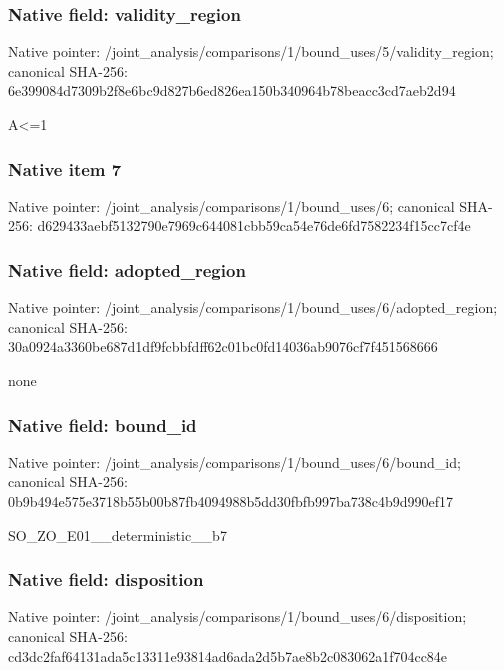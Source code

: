 \documentclass[10pt,a4paper]{article}
\begin{document}
\subsubsection{Native field: validity\_\allowbreak{}region}
Native pointer: /joint\_\allowbreak{}analysis/comparisons/1/bound\_\allowbreak{}uses/5/validity\_\allowbreak{}region; canonical SHA-256: 6e399084d7309b2f8e6bc9d827b6ed826ea150b340964b78beacc3cd7aeb2d94

\begingroup\raggedright\sloppy A<=\allowbreak{}1\par\endgroup

\subsubsection{Native item 7}
Native pointer: /joint\_\allowbreak{}analysis/comparisons/1/bound\_\allowbreak{}uses/6; canonical SHA-256: d629433aebf5132790e7969c644081cbb59ca54e76de6fd7582234f15cc7cf4e

\subsubsection{Native field: adopted\_\allowbreak{}region}
Native pointer: /joint\_\allowbreak{}analysis/comparisons/1/bound\_\allowbreak{}uses/6/adopted\_\allowbreak{}region; canonical SHA-256: 30a0924a3360be687d1df9fcbbfdff62c01bc0fd14036ab9076cf7f451568666

\begingroup\raggedright\sloppy none\par\endgroup

\subsubsection{Native field: bound\_\allowbreak{}id}
Native pointer: /joint\_\allowbreak{}analysis/comparisons/1/bound\_\allowbreak{}uses/6/bound\_\allowbreak{}id; canonical SHA-256: 0b9b494e575e3718b55b00b87fb4094988b5dd30fbfb997ba738c4b9d990ef17

\begingroup\raggedright\sloppy SO\_\allowbreak{}ZO\_\allowbreak{}E01\_\allowbreak{}\_\allowbreak{}deterministic\_\allowbreak{}\_\allowbreak{}b7\par\endgroup

\subsubsection{Native field: disposition}
Native pointer: /joint\_\allowbreak{}analysis/comparisons/1/bound\_\allowbreak{}uses/6/disposition; canonical SHA-256: cd3dc2faf64131ada5c13311e93814ad6ada2d5b7ae8b2c083062a1f704cc84e
\end{document}
